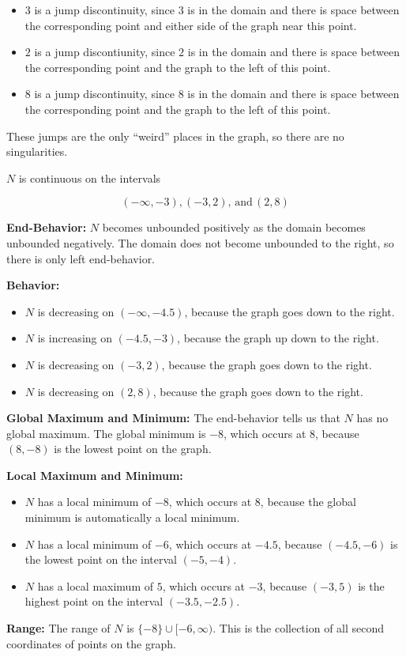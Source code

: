\documentclass{ximera}
\begin{document}
\begin{example}
\begin{itemize}
\item $3$ is a jump discontinuity, since $3$ is in the domain and there is space between the corresponding point and either side of the graph near this point. 
\item $2$ is a jump discontiunity, since $2$ is in the domain and there is space between the corresponding point and the graph to the left of this point. 
\item $8$ is a jump discontinuity, since $8$ is in the domain and there is space between the corresponding point and the graph to the left of this point. 
\end{itemize}


These jumps are the only ``weird'' places in the graph, so there are no singularities. 


$N$ is continuous on the intervals

\[
(-\infty, -3), (-3, 2), \, \text{and} \, (2, 8)
\]


\textbf{End-Behavior:}  $N$ becomes unbounded positively as the domain becomes unbounded negatively.  The domain does not become unbounded to the right, so there is only left end-behavior.

\textbf{Behavior:}  

\begin{itemize}
     \item $N$ is decreasing on $(-\infty, -4.5)$, because the graph goes down to the right.
     \item $N$ is increasing on $(-4.5, -3)$, because the graph up down to the right.
     \item $N$ is decreasing on $(-3, 2)$, because the graph goes down to the right.
     \item $N$ is decreasing on $(2, 8)$, because the graph goes down to the right.
\end{itemize}



\textbf{Global Maximum and Minimum:} The end-behavior tells us that $N$ has no global maximum.  The global minimum is $-8$, which occurs at $8$, because $(8,-8)$ is the lowest point on the graph. 


\textbf{Local Maximum and Minimum:} 

\begin{itemize}
     \item $N$ has a local minimum of $-8$, which occurs at $8$, because the global minimum is automatically a local minimum.
     \item $N$ has a local minimum of $-6$, which occurs at $-4.5$, because $(-4.5, -6)$ is the lowest point on the interval $(-5, -4)$.
     \item $N$ has a local maximum of $5$, which occurs at $-3$, because $(-3, 5)$ is the highest point on the interval $(-3.5, -2.5)$.

\end{itemize}

\textbf{Range:} The range of $N$ is $\{ -8 \} \cup [-6, \infty)$. This is the collection of all second coordinates of points on the graph.


\end{example}
\end{document}
